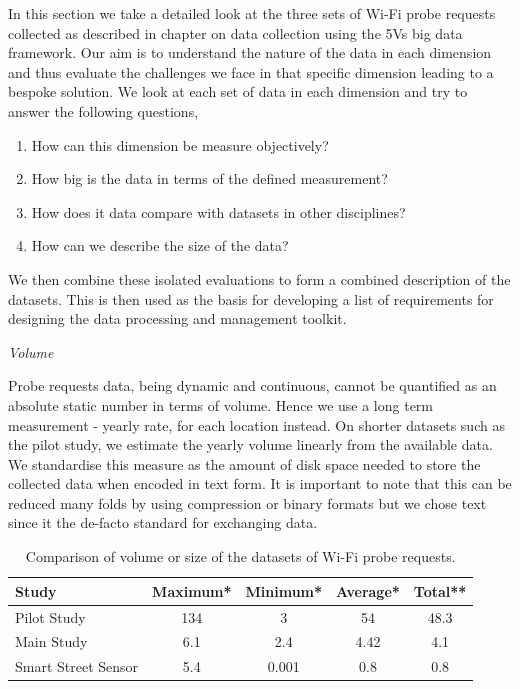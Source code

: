 In this section we take a detailed look at the three sets of Wi-Fi probe requests collected as described in chapter on data collection using the 5Vs big data framework.
Our aim is to understand the nature of the data in each dimension and thus evaluate the challenges we face in that specific dimension leading to a bespoke solution.
We look at each set of data in each dimension and try to answer the following questions,

\begin{enumerate}
  \setlength{\itemindent}{2em}
  \itemsep-0.25em
  \item{How can this dimension be measure objectively?}
  \item{How big is the data in terms of the defined measurement?}
  \item{How does it data compare with datasets in other disciplines?}
  \item{How can we describe the size of the data?}
\end{enumerate}

We then combine these isolated evaluations to form a combined description of the datasets. This is then used as the basis for developing a list of requirements for designing the data processing and management toolkit.


\vspace{1.5em}\noindent\textit{Volume}\vspace{0.5em}

\noindent Probe requests data, being dynamic and continuous, cannot be quantified as an absolute static number in terms of volume. 
Hence we use a long term measurement - yearly rate, for each location instead.
On shorter datasets such as the pilot study, we estimate the yearly volume linearly from the available data.
We standardise this measure as the amount of disk space needed to store the collected data when encoded in text form.
It is important to note that this can be reduced many folds by using compression or binary formats but we chose text since it the de-facto standard for exchanging data.

\begin{table}[h]
  \footnotesize
  \begin{center}
    \begin{tabular}{lcccc}
      \toprule
      Study & Maximum* & Minimum* & Average* & Total** \\
      \midrule
      Pilot Study & 134 & 3 & 54 & 48.3 \\
      Main Study & 6.1 & 2.4 & 4.42 & 4.1 \\
      Smart Street Sensor & 5.4 & 0.001 & 0.8 & 0.8 \\
      \bottomrule
    \end{tabular}
  \end{center}
  \caption{Comparison of volume or size of the datasets of Wi-Fi probe requests.}
  \label{table:toolkit:volume}
\end{table}

